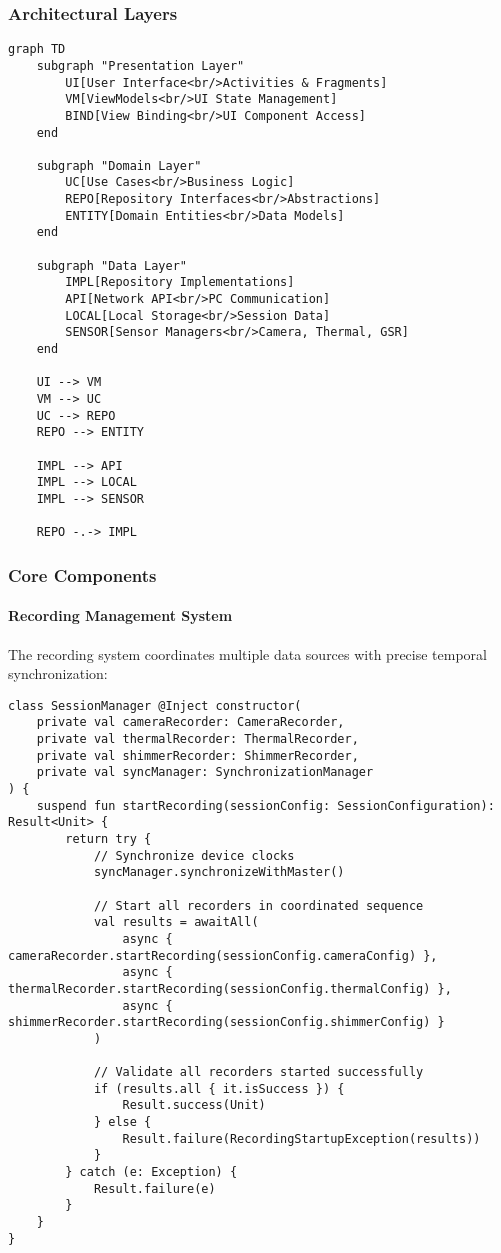 \documentclass[12pt,a4paper]{report}
\begin{document}
\subsubsection{Architectural Layers}

\begin{verbatim}
graph TD
    subgraph "Presentation Layer"
        UI[User Interface<br/>Activities & Fragments]
        VM[ViewModels<br/>UI State Management]
        BIND[View Binding<br/>UI Component Access]
    end
    
    subgraph "Domain Layer"
        UC[Use Cases<br/>Business Logic]
        REPO[Repository Interfaces<br/>Abstractions]
        ENTITY[Domain Entities<br/>Data Models]
    end
    
    subgraph "Data Layer"
        IMPL[Repository Implementations]
        API[Network API<br/>PC Communication]
        LOCAL[Local Storage<br/>Session Data]
        SENSOR[Sensor Managers<br/>Camera, Thermal, GSR]
    end
    
    UI --> VM
    VM --> UC
    UC --> REPO
    REPO --> ENTITY
    
    IMPL --> API
    IMPL --> LOCAL
    IMPL --> SENSOR
    
    REPO -.-> IMPL
\end{verbatim}

\subsubsection{Core Components}

\paragraph{Recording Management System}

The recording system coordinates multiple data sources with precise temporal synchronization:

\begin{verbatim}
class SessionManager @Inject constructor(
    private val cameraRecorder: CameraRecorder,
    private val thermalRecorder: ThermalRecorder,
    private val shimmerRecorder: ShimmerRecorder,
    private val syncManager: SynchronizationManager
) {
    suspend fun startRecording(sessionConfig: SessionConfiguration): Result<Unit> {
        return try {
            // Synchronize device clocks
            syncManager.synchronizeWithMaster()

            // Start all recorders in coordinated sequence
            val results = awaitAll(
                async { cameraRecorder.startRecording(sessionConfig.cameraConfig) },
                async { thermalRecorder.startRecording(sessionConfig.thermalConfig) },
                async { shimmerRecorder.startRecording(sessionConfig.shimmerConfig) }
            )

            // Validate all recorders started successfully
            if (results.all { it.isSuccess }) {
                Result.success(Unit)
            } else {
                Result.failure(RecordingStartupException(results))
            }
        } catch (e: Exception) {
            Result.failure(e)
        }
    }
}
\end{verbatim}
\end{document}
